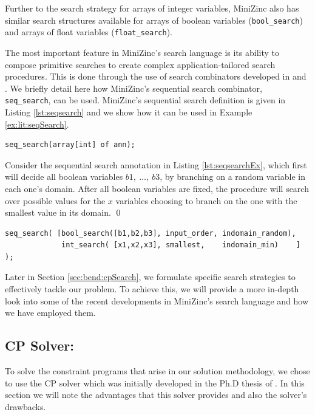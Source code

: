 Further to the search strategy for arrays of integer variables, MiniZinc also has
similar search structures available for arrays of boolean variables ({\tt bool\_search}) and 
arrays of float variables ({\tt float\_search}).

The most important feature in MiniZinc's search language is its ability to compose
primitive searches to create complex application-tailored search procedures.
This is done through the use of search combinators developed in \cite{Schrijvers2013b}
and \cite{Schrijvers2013a}.
We briefly detail here how MiniZinc's sequential search
combinator, {\tt seq\_search}, can be used. MiniZinc's sequential search definition
is given in Listing \ref{lst:seqsearch} and we show how it
can be used in Example \ref{ex:lit:seqSearch}.

\begin{lstlisting}[caption={Sequential search procedure},label={lst:seqsearch},language=minizinc]
seq_search(array[int] of ann);
\end{lstlisting}\vspace{5mm}

\begin{example}\label{ex:lit:seqSearch}
	Consider the sequential search annotation in Listing \ref{lst:seqsearchEx},
	which first will decide all boolean variables $b1,\:\ldots,\:b3$, by branching on
	a random variable in each one's domain.
	After all boolean variables are fixed, the procedure will search over
	possible values for the $x$ variables choosing to branch on the one with the smallest value in its domain. \qed
\end{example}
\begin{lstlisting}[caption={Example of a sequential search annotation},label={lst:seqsearchEx},language=minizinc]
seq_search( [bool_search([b1,b2,b3], input_order, indomain_random), 
             int_search( [x1,x2,x3], smallest,    indomain_min)    ] );
\end{lstlisting}\vspace{5mm}

Later in Section \ref{sec:bend:cpSearch}, we formulate specific
search strategies to effectively tackle our problem.
To achieve this, we will provide 
a more in-depth look into some of the recent developments in
MiniZinc's search language and how we have employed them.

\subsection{CP Solver: \chuffed}
\label{sec:lit:cpChuffed}
To solve the constraint programs that arise in our solution 
methodology, we chose to use the CP solver \chuffed which
was initially developed in the Ph.D thesis of .
In this section we will note the advantages that this solver
provides and also the solver's drawbacks.

